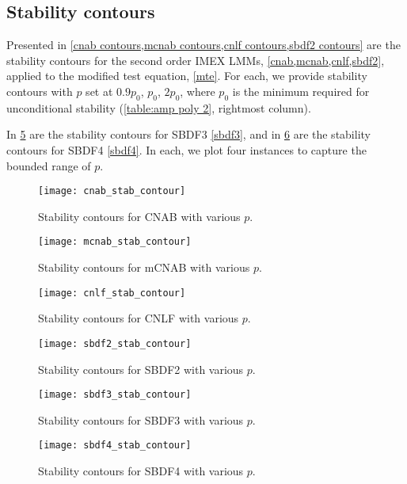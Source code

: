 \subsection{Stability contours}
Presented in \cref{cnab contours,mcnab contours,cnlf contours,sbdf2 contours} are the stability contours for the second order IMEX LMMs, \cref{cnab,mcnab,cnlf,sbdf2}, applied to the modified test equation, \cref{mte}. For each, we provide stability contours with $p$ set at $0.9p_0$, $p_0$, $2p_0$, where $p_0$ is the minimum required for unconditional stability (\cref{table:amp poly 2}, rightmost column). 

In \cref{sbdf3 contours} are the stability contours for SBDF3 \cref{sbdf3}, and in \cref{sbdf4 contours} are the stability contours for SBDF4 \cref{sbdf4}. In each, we plot four instances to capture the bounded range of $p$.
\begin{figure}[htb!]
        \centering
\texttt{[image: cnab\_stab\_contour]}
\caption{Stability contours for CNAB with various $p$.}
\label{cnab contours}
\end{figure}
\begin{figure}[htb!]
        \centering
\texttt{[image: mcnab\_stab\_contour]}
\caption{Stability contours for mCNAB with various $p$.}
\label{mcnab contours}
\end{figure}
\begin{figure}[htb!]
        \centering
\texttt{[image: cnlf\_stab\_contour]}
\caption{Stability contours for CNLF with various $p$.}
\label{cnlf contours}
\end{figure}
\begin{figure}[htb!]
        \centering
\texttt{[image: sbdf2\_stab\_contour]}
\caption{Stability contours for SBDF2 with various $p$.}
\label{sbdf2 contours}
\end{figure}

\begin{figure}[htb!]
        \centering
\texttt{[image: sbdf3\_stab\_contour]}
\caption{Stability contours for SBDF3 with various $p$.}
\label{sbdf3 contours}
\end{figure}

\begin{figure}[htb!]
        \centering
\texttt{[image: sbdf4\_stab\_contour]}
\caption{Stability contours for SBDF4 with various $p$.}
\label{sbdf4 contours}
\end{figure}

